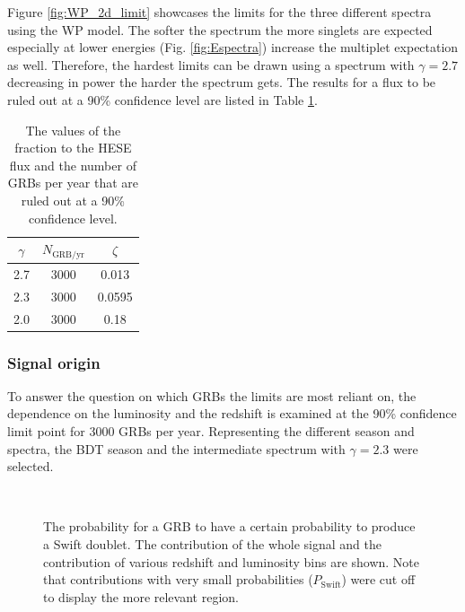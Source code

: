 Figure \ref{fig:WP_2d_limit} showcases the limits for the three different 
spectra using the WP model. The softer the spectrum the more singlets are 
expected especially at lower energies (Fig. \ref{fig:Espectra}) increase the 
multiplet expectation as well. Therefore, the hardest limits can be 
drawn using a spectrum with $\gamma=2.7$ decreasing in power the harder the 
spectrum gets. The results for a flux to be ruled out at a 90\% confidence 
level are listed in Table \ref{tab:WP_2d_limit_3000}.


\begin{table}[h]
  \centering
  \begin{tabular}{c|c|c}
$\gamma$  &  $N_\mathrm{GRB/yr}$ & $\zeta$ \\
\hline
2.7 & 3000 & 0.013 \\
2.3 & 3000 & 0.0595 \\
2.0 & 3000 & 0.18 \\
  \end{tabular}
  \caption{The values of the fraction to the HESE flux and the number of GRBs 
per year that are ruled out at a 90\% confidence level.}
  \label{tab:WP_2d_limit_3000}
\end{table}


\subsubsection{Signal origin}
To answer the question on which GRBs the limits are most reliant on, the 
dependence on the luminosity and the redshift is examined at the 90\% 
confidence limit point for 3000 GRBs per year. Representing the different 
season and spectra, the BDT season and the intermediate spectrum with 
$\gamma=2.3$ were selected.

\begin{figure}[h!]
\centering
 \captionsetup{width=.9\textwidth}
\\
\caption{The probability for a GRB to have a certain probability to produce a 
Swift doublet. The contribution of the whole signal and the contribution of 
various redshift and luminosity bins are shown. Note that contributions with 
very small 
probabilities ($P_\mathrm{Swift}$) were cut off to display the more relevant 
region.}
\end{figure}


